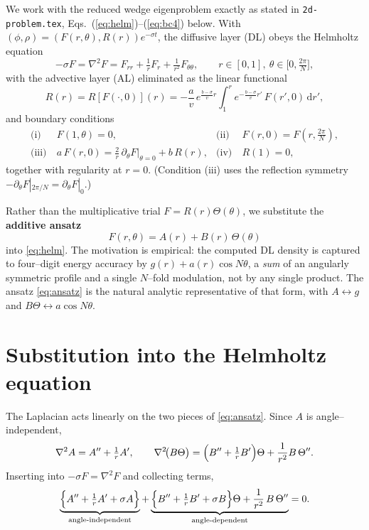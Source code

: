 \documentclass{article}
\newcommand{\rd}{\mathrm{d}}
\begin{document}
We work with the reduced wedge eigenproblem exactly as stated in
\texttt{2d-problem.tex}, Eqs.~(\ref{eq:helm})--(\ref{eq:bc4}) below. With
$(\phi,\rho)=(F(r,\theta),R(r))e^{-\sigma t}$, the diffusive layer (DL) obeys the
Helmholtz equation
\begin{equation}
-\sigma F=\nabla^2 F=F_{rr}+\tfrac1r F_r+\tfrac1{r^2}F_{\theta\theta},
\qquad r\in[0,1],\ \theta\in\bigl[0,\tfrac{2\pi}{N}\bigr],
\label{eq:helm}
\end{equation}
with the advective layer (AL) eliminated as the linear functional
\begin{equation}
R(r)=R[F(\cdot,0)](r)
=-\frac{a}{v}\,e^{\frac{b-\sigma}{v}r}
\int_1^r e^{-\frac{b-\sigma}{v}r'}\,F(r',0)\,\rd r',
\label{eq:RofF}
\end{equation}
and boundary conditions
\begin{align}
\text{(i)}\ & F(1,\theta)=0,
&\text{(ii)}\ & F(r,0)=F\!\left(r,\tfrac{2\pi}{N}\right),
\label{eq:bc12}\\
\text{(iii)}\ & a\,F(r,0)=\frac{2}{r}\,\partial_\theta F\big|_{\theta=0}+b\,R(r),
&\text{(iv)}\ & R(1)=0,
\label{eq:bc4}
\end{align}
together with regularity at $r=0$. (Condition (iii) uses the reflection symmetry
$-\partial_\theta F|_{2\pi/N}=\partial_\theta F|_{0}$.)

Rather than the multiplicative trial $F=R(r)\Theta(\theta)$, we substitute the
\textbf{additive ansatz}
\begin{equation}
\boxed{\,F(r,\theta)=A(r)+B(r)\,\Theta(\theta)\,}
\label{eq:ansatz}
\end{equation}
into \eqref{eq:helm}. The motivation is empirical: the computed DL density is
captured to four--digit energy accuracy by $g(r)+a(r)\cos N\theta$, a
\emph{sum} of an angularly symmetric profile and a single $N$--fold modulation,
not by any single product. The ansatz \eqref{eq:ansatz} is the natural analytic
representative of that form, with $A\leftrightarrow g$ and
$B\Theta\leftrightarrow a\cos N\theta$.

\section{Substitution into the Helmholtz equation}

The Laplacian acts linearly on the two pieces of \eqref{eq:ansatz}. Since $A$ is
angle--independent,
\begin{equation}
\nabla^2 A=A''+\tfrac1r A',
\qquad
\nabla^2\!\bigl(B\Theta\bigr)
=\Bigl(B''+\tfrac1r B'\Bigr)\Theta+\frac{1}{r^2}B\,\Theta''.
\end{equation}
Inserting into $-\sigma F=\nabla^2F$ and collecting terms,
\begin{equation}
\underbrace{\Bigl\{A''+\tfrac1r A'+\sigma A\Bigr\}}_{\text{angle-independent}}
+\underbrace{\Bigl\{B''+\tfrac1r B'+\sigma B\Bigr\}\Theta
+\frac{1}{r^2}\,B\,\Theta''}_{\text{angle-dependent}}=0 .
\label{eq:collected}
\end{equation}
\end{document}

